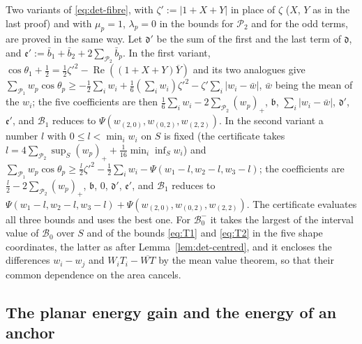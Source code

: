 \begin{remark}\label{rem:det-fibrevar}
Two variants of \eqref{eq:det-fibre}, with $\zeta':=|1+X+Y|$ in place of $\zeta$ ($X$, $Y$ as in the last proof) and with $\mu_p=1$,
$\lambda_p=0$ in the bounds for $\mathcal P_2$ and for the odd terms, are proved in the same way. Let $\mathfrak d'$ be the sum of the
first and the last term of $\mathfrak d$, and $\mathfrak e':=\bar b_1+\bar b_2+2\sum_{\mathcal P_2}\bar b_p$. In the first variant,
$\cos\theta_1+\frac12=\frac12\zeta'^2-\operatorname{Re}((1+X+Y)\overline Y)$ and its two analogues give
$\sum_{\mathcal P_1}w_p\cos\theta_p\ge-\frac12\sum_iw_i+\frac16(\sum_iw_i)\zeta'^2-\zeta'\sum_i|w_i-\bar w|$, $\bar w$ being the mean
of the $w_i$; the five coefficients are then $\frac16\sum_iw_i-2\sum_{\mathcal P_2}(w_p)_+$, $\mathfrak b$, $\sum_i|w_i-\bar w|$,
$\mathfrak d'$, $\mathfrak e'$, and $\mathcal B_1$ reduces to $\Psi(w_{(2,0)},w_{(0,2)},w_{(2,2)})$. In the second variant a number $l$ with
$0\le l<\min_iw_i$ on $S$ is fixed (the certificate takes
$l=4\sum_{\mathcal P_2}\sup_S(w_p)_++\frac1{16}\min_i\inf_Sw_i$) and
$\sum_{\mathcal P_1}w_p\cos\theta_p\ge\frac l2\zeta'^2-\frac12\sum_iw_i-\Psi(w_1-l,w_2-l,w_3-l)$; the
coefficients are $\frac l2-2\sum_{\mathcal P_2}(w_p)_+$, $\mathfrak b$, $0$, $\mathfrak d'$, $\mathfrak e'$, and $\mathcal B_1$ reduces to
$\Psi(w_1-l,w_2-l,w_3-l)+\Psi(w_{(2,0)},w_{(0,2)},w_{(2,2)})$. The certificate evaluates all three bounds and uses the best one.
For $\mathcal B_0^-$ it takes the largest of the interval value of $\mathcal B_0$ over $S$ and of the bounds \eqref{eq:T1} and
\eqref{eq:T2} in the five shape coordinates, the latter as after Lemma~\ref{lem:det-centred}, and it encloses the differences
$w_i-w_j$ and $W_iT_i-\overline{WT}$ by the mean value theorem, so that their common dependence on the area cancels.
\end{remark}

\subsection{The planar energy gain and the energy of an anchor}\label{ssec:det-layer}


